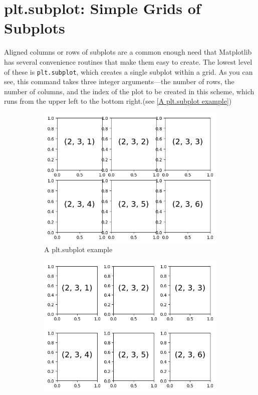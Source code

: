 \section{plt.subplot: Simple Grids of Subplots}
Aligned columns or rows of subplots are a common enough need that Matplotlib has
several convenience routines that make them easy to create. The lowest level of these
is \verb|plt.subplot|, which creates a single subplot within a grid. As you can see, this
command takes three integer arguments—the number of rows, the number of columns, and the index of the plot to be created in this scheme, which runs from the
upper left to the bottom right.(see \autoref{A plt.subplot example})

\begin{figure}
    \centering
    \begin{subfigure}[b]{.45\textwidth}
        \includegraphics[width=\textwidth]{../img/A plt.subplot example.png}
        \caption{A plt.subplot example}
        \label{A plt.subplot example}
    \end{subfigure}
    \hfill
    \begin{subfigure}[b]{.45\textwidth}
        \includegraphics[width=\textwidth]{../img/plt.subplot with adjusted margins.png}

\end{subfigure}
\end{figure}
